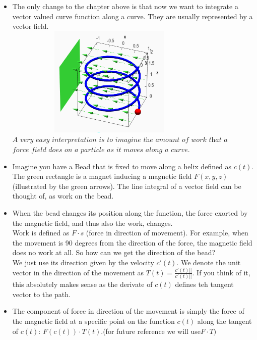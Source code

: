 \documentclass[12pt,a4paper]{article}
\begin{document}
	\begin{itemize}
	\item The only change to the chapter above is that now we want to integrate a vector valued curve function along a curve. They are usually represented by a vector field.\\	\includegraphics[width=0.8\textwidth, height = 200px]{Field_Helix.png}
	\\ $\textit{A very easy interpretation is to imagine the amount of work that a}$\\ $\textit{force field does on a particle as it moves along a curve.}$
	
	\item Imagine you have a Bead that is fixed to move along a helix defined as $c(t)$. The green rectangle is a magnet inducing a magnetic field $F(x,y,z)$(illustrated by the green arrows). The line integral of a vector field can be thought of, as work on the bead. 
	
	\item When the bead changes its position along the function, the force exorted by the magnetic field, and thus also the work, changes.\\
	
	Work is defined as $F\cdot s$ (force in direction of movement). For example, when the movement is 90 degrees from the direction of the force, the magnetic field does no work at all. So how can we get the direction of the bead? \\
	
	We just use its direction given by the velocity $c'(t)$. We denote the unit vector in the direction of the movement as $T(t) = \frac{c'(t)||}{c'(t)||}$. If you think of it, this absolutely makes sense as the derivate of $c(t)$ defines teh tangent vector to the path. 
	
	\item  The component of force in direction of the movement is simply the force of the magnetic field at a specific point on the function $c(t)$ along the tangent of $c(t)$: $F(c(t))\cdot T(t)$.(for future reference we will use$F\cdot T)$ \\
	

\end{itemize}
\end{document}
